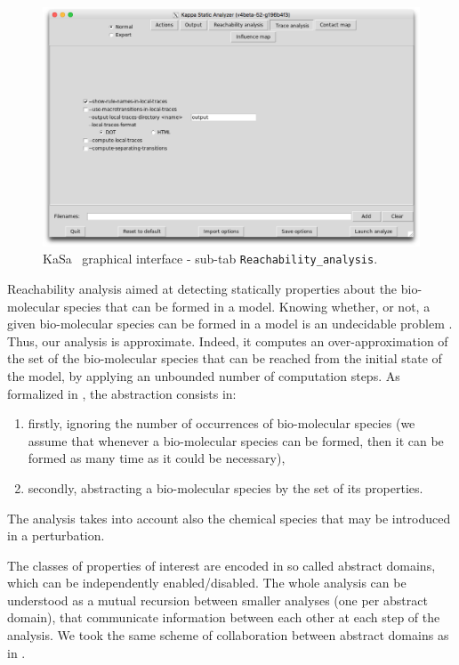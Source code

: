 \documentclass[11pt]{book}
\def\KaSa{\textsf{KaSa}}
\begin{document}
\begin{figure}[htbp]
\centering
\includegraphics[width=12cm]{img/kasa_3.png}
\caption{\KaSa~ graphical interface - sub-tab \texttt{Reachability\_analysis}.}
\label{fig:kasa:2}
\end{figure}

Reachability analysis aimed at detecting statically properties about the bio-molecular species that can be formed in a model.
Knowing whether, or not, a given bio-molecular species can be formed in a model is an undecidable problem \cite{Kreyssig}. Thus, our analysis is approximate. Indeed, it computes an over-approximation of the set of the bio-molecular species that can be reached from the initial state of the model, by applying an unbounded number of computation steps. As formalized in \cite{DanosEtAl-VMCAI08,Feret:SASB2016}, the abstraction consists in:
\begin{enumerate}
\item firstly, ignoring the number of occurrences of bio-molecular species (we assume that whenever a bio-molecular species can be formed, then it can be formed as many time as it could be necessary),
\item secondly, abstracting a bio-molecular species by the set of its properties.
\end{enumerate}
The analysis takes into account also the chemical species that may be introduced in a perturbation.

The classes of properties of interest are encoded in so called abstract domains, which can be independently enabled/disabled. The whole analysis can be understood as a mutual recursion between smaller analyses (one per abstract domain), that communicate information between each other at each step of the analysis. We took the same scheme of collaboration between abstract domains as in  \cite{CousotEtAl06-ASIAN}.
\end{document}
